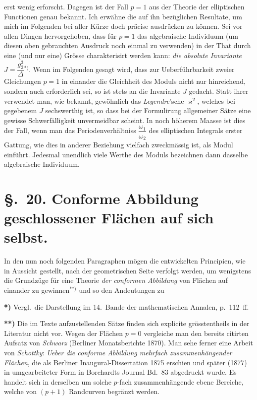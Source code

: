 \documentclass{article}
\begin{document}
erst wenig erforscht. Dagegen ist der Fall $p = 1$ aus der Theorie der elliptischen Functionen genau bekannt. Ich erwähne die auf ihn bezüglichen Resultate, um mich im Folgenden bei aller Kürze doch präcise ausdrücken zu können. Sei vor allen Dingen hervorgehoben, dass für $p = 1$ das algebraische Individuum (um diesen oben gebrauchten Ausdruck noch einmal zu verwenden) in der That durch eine (und nur eine) Grösse charakterisirt werden kann: \emph{die absolute Invariante $J = \dfrac{g_{2}^{3}}{\Delta}$}${}^{*)}$. Wenn im Folgenden gesagt wird, dass zur Ueberführbarkeit zweier Gleichungen $p = 1$ in einander die Gleichheit des Moduls nicht nur hinreichend, sondern auch erforderlich sei, so ist stets an die Invariante $J$ gedacht. Statt ihrer verwendet man, wie bekannt, gewöhnlich das \emph{Legendre}'sche $\varkappa^{2}$, welches bei gegebenem $J$ sechswerthig ist, so dass bei der Formulirung allgemeiner Sätze eine gewisse Schwerfälligkeit unvermeidbar scheint. In noch höherem Maasse ist dies der Fall, wenn man das Periodenverhältniss $\dfrac{\omega_{1}}{\omega_{2}}$ des elliptischen Integrals erster Gattung, wie dies in anderer Beziehung vielfach zweckmässig ist, als Modul einführt. Jedesmal unendlich viele Werthe des Moduls bezeichnen dann dasselbe algebraische Individuum.

\section*{§.~20. Conforme Abbildung geschlossener Flächen auf sich selbst.}

In den nun noch folgenden Paragraphen mögen die entwickelten Principien, wie in Aussicht gestellt, nach der geometrischen Seite verfolgt werden, um wenigstens die Grundzüge für eine Theorie \emph{der conformen Abbildung} von Flächen auf einander zu gewinnen${}^{**)}$ und so den Andeutungen zu

\textbf{*)} Vergl.\ die Darstellung im 14.\ Bande der mathematischen Annalen, p.~112~ff.

\textbf{**)} Die im Texte aufzustellenden Sätze finden sich explicite grösstentheils in der Literatur nicht vor. Wegen der Flächen $p = 0$ vergleiche man den bereits citirten Aufsatz von \emph{Schwarz} (Berliner Monatsberichte 1870). Man sehe ferner eine Arbeit von \emph{Schottky}: \emph{Ueber die conforme Abbildung mehrfach zusammenhängender Flächen}, die als Berliner Inaugural-Dissertation 1875 erschien und später (1877) in umgearbeiteter Form in Borchardts Journal Bd.~83 abgedruckt wurde. Es handelt sich in derselben um solche $p$-fach zusammenhängende ebene Bereiche, welche von $(p + 1)$ Randcurven begränzt werden.
\end{document}
